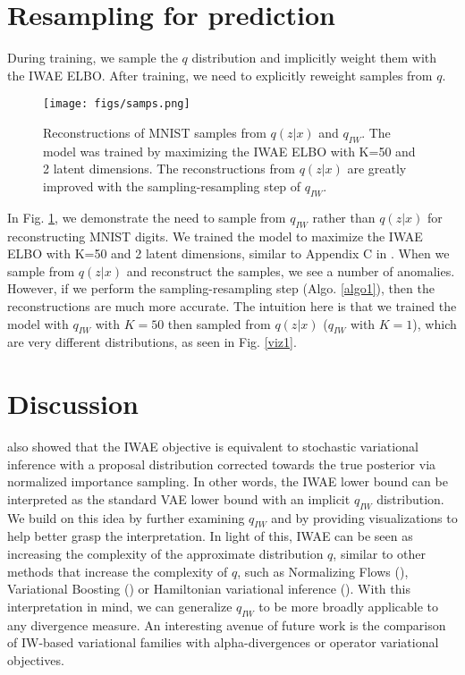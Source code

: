 \documentclass{article} %
\begin{document}
\section{Resampling for prediction}
During training, we sample the $q$ distribution and implicitly weight them with the IWAE ELBO. After training, we need to explicitly reweight samples from $q$.

\begin{figure}[h]
  \centering
      \texttt{[image: figs/samps.png]}
  \caption{Reconstructions of MNIST samples from $q(z|x)$ and $q_{IW}$. The model was trained by maximizing the IWAE ELBO with K=50 and 2 latent dimensions. The reconstructions from $q(z|x)$ are greatly improved with the sampling-resampling step of $q_{IW}$.}
  \label{recon}
\end{figure}

In Fig. \ref{recon}, we demonstrate the need to sample from $q_{IW}$ rather than $q(z|x)$ for reconstructing MNIST digits. We trained the model to maximize the IWAE ELBO with K=50 and 2 latent dimensions, similar to Appendix C in \cite{burda2015importance}. When we sample from $q(z|x)$ and reconstruct the samples, we see a number of anomalies. However, if we perform the sampling-resampling step (Algo. \ref{algo1}), then the reconstructions are much more accurate. The intuition here is that we trained the model with $q_{IW}$ with $K=50$ then sampled from $q(z|x)$ ($q_{IW}$ with $K=1$), which are very different distributions, as seen in Fig. \ref{viz1}.



\section{Discussion}

\cite{bachman} also showed that the IWAE objective is equivalent to stochastic variational inference with a proposal distribution corrected towards the true posterior via normalized importance sampling. In other words, the IWAE lower bound can be interpreted as the standard VAE lower bound with an implicit $q_{IW}$ distribution. We build on this idea by further examining $q_{IW}$ and by providing visualizations to help better grasp the interpretation. In light of this, IWAE can be seen as increasing the complexity of the approximate distribution $q$, similar to other methods that increase the complexity of $q$, such as Normalizing Flows (\cite{normflow}), Variational Boosting (\cite{varboosting}) or Hamiltonian variational inference (\cite{salimans2015markov}). With this interpretation in mind, we can generalize $q_{IW}$ to be more broadly applicable to any divergence measure. An interesting avenue of future work is the comparison of IW-based variational families with alpha-divergences or operator variational objectives. 
\end{document}
